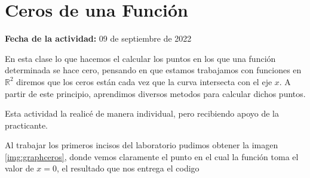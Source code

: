\documentclass[../portafolio.tex]{subfiles}
\begin{document}


\section{Ceros de una Funci\'on}   %

\hfill \textbf{Fecha de la actividad:} 09 de septiembre de 2022

\medskip

En esta clase lo que hacemos el calcular los puntos en los que una funci\'on determinada se hace cero, pensando en que estamos trabajamos con funciones en $\mathbb{R}^2$ diremos que los ceros est\'an cada vez que la curva intersecta con el eje $x$. A partir de este principio, aprendimos diversos metodos para calcular dichos puntos.


Esta actividad la realic\'e de manera individual, pero recibiendo apoyo de la practicante.

Al trabajar los primeros incisos del laboratorio pudimos obtener la imagen \ref{img:graphceros}, donde vemos claramente el punto en el cual la funci\'on toma el valor de $x=0$, el resultado que nos entrega el codigo 
\end{document}

